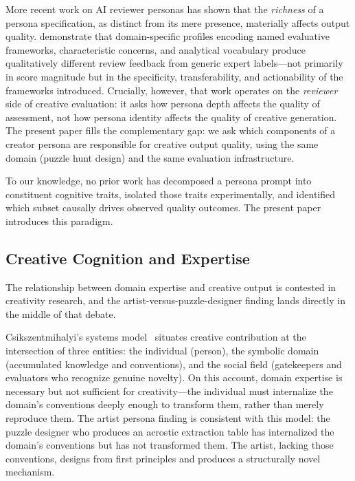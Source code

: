 More recent work on AI reviewer personas has shown that the \emph{richness} of a persona specification, as distinct from its mere presence, materially affects output quality. \citet{dellaLibera2025panel} demonstrate that domain-specific profiles encoding named evaluative frameworks, characteristic concerns, and analytical vocabulary produce qualitatively different review feedback from generic expert labels---not primarily in score magnitude but in the specificity, transferability, and actionability of the frameworks introduced. Crucially, however, that work operates on the \emph{reviewer} side of creative evaluation: it asks how persona depth affects the quality of assessment, not how persona identity affects the quality of creative generation. The present paper fills the complementary gap: we ask which components of a creator persona are responsible for creative output quality, using the same domain (puzzle hunt design) and the same evaluation infrastructure.

To our knowledge, no prior work has decomposed a persona prompt into constituent cognitive traits, isolated those traits experimentally, and identified which subset causally drives observed quality outcomes. The present paper introduces this paradigm.

\subsection{Creative Cognition and Expertise}

The relationship between domain expertise and creative output is contested in creativity research, and the artist-versus-puzzle-designer finding lands directly in the middle of that debate.

Csikszentmihalyi's systems model~\cite{csikszentmihalyi1996creativity} situates creative contribution at the intersection of three entities: the individual (person), the symbolic domain (accumulated knowledge and conventions), and the social field (gatekeepers and evaluators who recognize genuine novelty). On this account, domain expertise is necessary but not sufficient for creativity---the individual must internalize the domain's conventions deeply enough to transform them, rather than merely reproduce them. The artist persona finding is consistent with this model: the puzzle designer who produces an acrostic extraction table has internalized the domain's conventions but has not transformed them. The artist, lacking those conventions, designs from first principles and produces a structurally novel mechanism.

